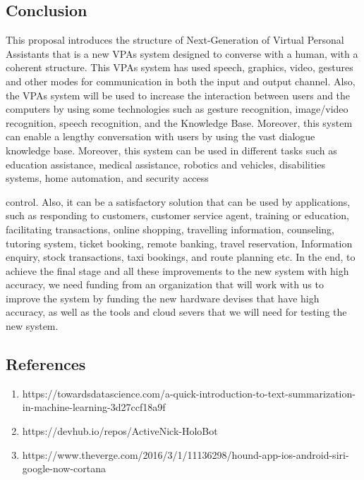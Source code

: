 \documentclass[12pt,a4paper]{article}
\begin{document}
\newpage
\begin{center}
\section{Conclusion}
\end{center}

This proposal introduces the structure of Next-Generation
of Virtual Personal Assistants that is a new VPAs system
designed to converse with a human, with a coherent structure.
This VPAs system has used speech, graphics, video, gestures
and other modes for communication in both the input and
output channel. Also, the VPAs system will be used to increase
the interaction between users and the computers by using some
technologies such as gesture recognition, image/video
recognition, speech recognition, and the Knowledge Base.
Moreover, this system can enable a lengthy conversation with
users by using the vast dialogue knowledge base. Moreover,
this system can be used in different tasks such as education
assistance, medical assistance, robotics and vehicles,
disabilities systems, home automation, and security access
\par
control. Also, it can be a satisfactory solution that can be used
by applications, such as responding to customers, customer
service agent, training or education, facilitating transactions,
online shopping, travelling information, counseling, tutoring
system, ticket booking, remote banking, travel reservation,
Information enquiry, stock transactions, taxi bookings, and
route planning etc. In the end, to achieve the final stage and all
these improvements to the new system with high accuracy, we
need funding from an organization that will work with us to
improve the system by funding the new hardware devises that
have high accuracy, as well as the tools and cloud severs that
we will need for testing the new system.


\newpage
\begin{center}
\section{References}
\end{center}
\begin{enumerate}

\item https://towardsdatascience.com/a-quick-introduction-to-text-summarization-in-machine-learning-3d27ccf18a9f
\item https://devhub.io/repos/ActiveNick-HoloBot 
\item https://www.theverge.com/2016/3/1/11136298/hound-app-ios-android-siri-google-now-cortana
\end{enumerate}
\end{document}
